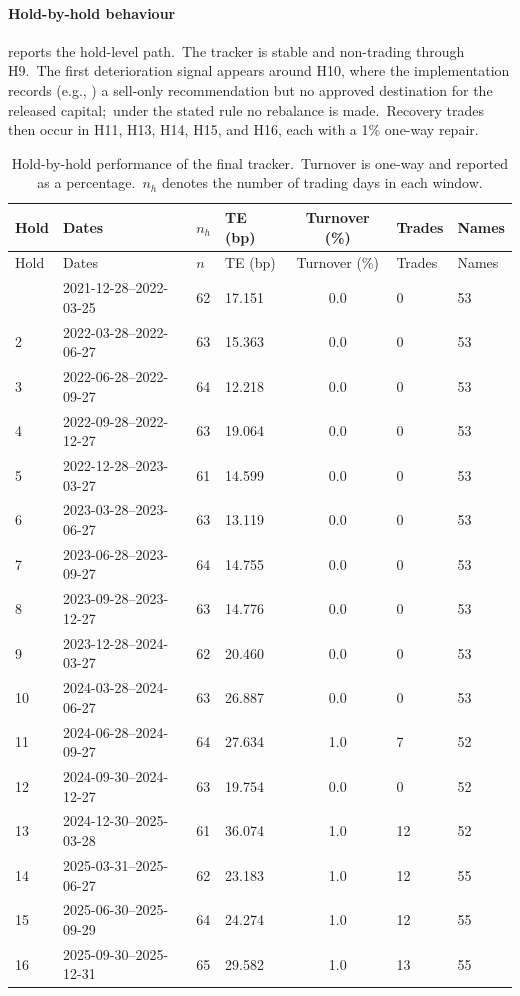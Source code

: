 \documentclass[11pt]{article}
\begin{document}
\paragraph{Hold-by-hold behaviour}

 reports the hold-level path.\ The tracker is stable and non-trading through H9.\ The first deterioration signal appears around H10, where the implementation records (e.g., ) a sell-only recommendation but no approved destination for the released capital;\ under the stated rule no rebalance is made.\ Recovery trades then occur in H11, H13, H14, H15, and H16, each with a 1\% one-way repair.

\begin{longtable}{llllcll}
\caption{Hold-by-hold performance of the final tracker.\ Turnover is one-way and reported as a percentage.\ $n_h$ denotes the number of trading days in each window.}\label{tab:hold-by-hold}\\
\toprule
Hold & \hspace{3.5em}Dates & $n_h$ & TE (bp) & Turnover (\%) & Trades & Names \\
\midrule
\endfirsthead
\toprule
Hold & \hspace{3.5em}Dates & $n$ & TE (bp) & Turnover (\%) & Trades & Names \\
\midrule
\endhead
\bottomrule
\endlastfoot
1 & 2021-12-28--2022-03-25 & 62 & 17.151 & 0.0 & 0 & 53 \\
2 & 2022-03-28--2022-06-27 & 63 & 15.363 & 0.0 & 0 & 53 \\
3 & 2022-06-28--2022-09-27 & 64 & 12.218 & 0.0 & 0 & 53 \\
4 & 2022-09-28--2022-12-27 & 63 & 19.064 & 0.0 & 0 & 53 \\
5 & 2022-12-28--2023-03-27 & 61 & 14.599 & 0.0 & 0 & 53 \\
6 & 2023-03-28--2023-06-27 & 63 & 13.119 & 0.0 & 0 & 53 \\
7 & 2023-06-28--2023-09-27 & 64 & 14.755 & 0.0 & 0 & 53 \\
8 & 2023-09-28--2023-12-27 & 63 & 14.776 & 0.0 & 0 & 53 \\
9 & 2023-12-28--2024-03-27 & 62 & 20.460 & 0.0 & 0 & 53 \\
10 & 2024-03-28--2024-06-27 & 63 & 26.887 & 0.0 & 0 & 53 \\
11 & 2024-06-28--2024-09-27 & 64 & 27.634 & 1.0 & 7 & 52 \\
12 & 2024-09-30--2024-12-27 & 63 & 19.754 & 0.0 & 0 & 52 \\
13 & 2024-12-30--2025-03-28 & 61 & 36.074 & 1.0 & 12 & 52 \\
14 & 2025-03-31--2025-06-27 & 62 & 23.183 & 1.0 & 12 & 55 \\
15 & 2025-06-30--2025-09-29 & 64 & 24.274 & 1.0 & 12 & 55 \\
16 & 2025-09-30--2025-12-31 & 65 & 29.582 & 1.0 & 13 & 55 \\
\end{longtable}
\end{document}
